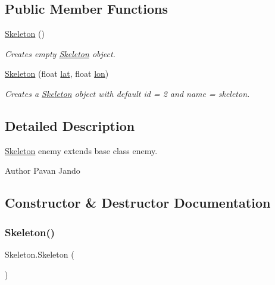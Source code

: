 \subsection*{Public Member Functions}
\begin{DoxyCompactItemize}
\item 
\mbox{\hyperlink{class_skeleton_af1c9d32b27cede51ca48340b58781ec0}{Skeleton}} ()
\begin{DoxyCompactList}\small\item\em Creates empty \mbox{\hyperlink{class_skeleton}{Skeleton}} object. \end{DoxyCompactList}\item 
\mbox{\hyperlink{class_skeleton_a46c25f00abbbdfb8a0ab268285f13cb9}{Skeleton}} (float \mbox{\hyperlink{class_enemy_adda4a5f0af5eb4dc061e162ee46e940c}{lat}}, float \mbox{\hyperlink{class_enemy_a8ae77cbcd385c768eb0649a31718a08e}{lon}})
\begin{DoxyCompactList}\small\item\em Creates a \mbox{\hyperlink{class_skeleton}{Skeleton}} object with default id = 2 and name = skeleton. \end{DoxyCompactList}\end{DoxyCompactItemize}


\subsection{Detailed Description}
\mbox{\hyperlink{class_skeleton}{Skeleton}} enemy extends base class enemy. 

\begin{DoxyAuthor}{Author}
Pavan Jando
\end{DoxyAuthor}


\subsection{Constructor \& Destructor Documentation}
\mbox{\label{class_skeleton_af1c9d32b27cede51ca48340b58781ec0}} 
\subsubsection{\texorpdfstring{Skeleton()}{Skeleton()}\hspace{0.1cm}{\footnotesize\ttfamily [1/2]}}
{\footnotesize\ttfamily Skeleton.\+Skeleton (\begin{DoxyParamCaption}{ }\end{DoxyParamCaption})}




